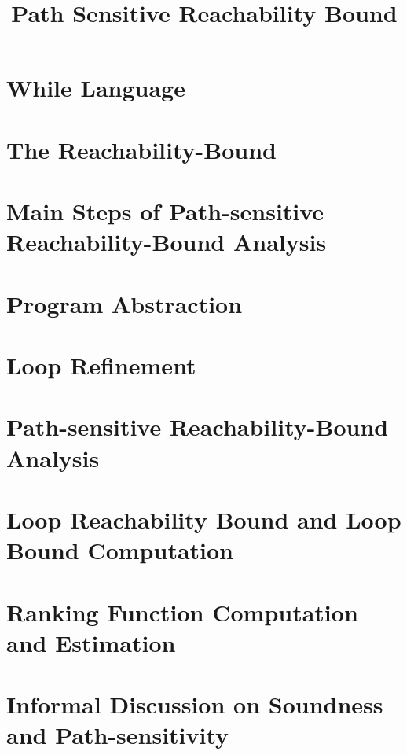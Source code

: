 \documentclass[a4paper,11pt]{article}
\begin{document}
\title{Path Sensitive Reachability Bound}

\author{}

\date{}

\maketitle
%
\tableofcontents

% 
\section{{While Language}}
\label{sec:language}

\section{{The Reachability-Bound}}
\label{sec:execution_rb}

\section{Main Steps of Path-sensitive Reachability-Bound Analysis}
\label{sec:static_rb}

\section{Program Abstraction}
\label{sec:progabs}

\section{Loop Refinement}
\label{sec:refine}

\section{Path-sensitive Reachability-Bound Analysis}
\label{sec:psrb}

  
\section{Loop Reachability Bound and Loop Bound Computation}
\label{sec:looprb}

\section{Ranking Function Computation and Estimation}
\label{sec:outinalg}

\section{Informal Discussion on Soundness and Path-sensitivity}
\label{sec:thminformal}

\end{document}

